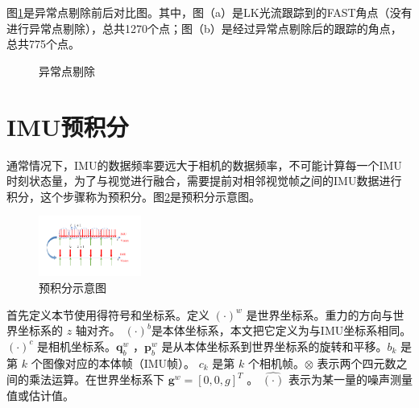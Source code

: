 图\ref{fig3_6}是异常点剔除前后对比图。其中，图（a）是LK光流跟踪到的FAST角点（没有进行异常点剔除），总共1270个点；图（b）是经过异常点剔除后的跟踪的角点，总共775个点。
\begin{figure}[h]\setlength{\belowcaptionskip}{-12pt}
\centering
	\caption{异常点剔除}\label{fig3_6}
\end{figure}
\section{IMU预积分}
通常情况下，IMU的数据频率要远大于相机的数据频率，不可能计算每一个IMU时刻状态量，为了与视觉进行融合，需要提前对相邻视觉帧之间的IMU数据进行积分，这个步骤称为预积分。图\ref{fig3_7}是预积分示意图。
\begin{figure}[h]\setlength{\belowcaptionskip}{-12pt}
	\centering
	\includegraphics[width=0.3\textwidth, angle=-90]{figures/chapter3/fig3_7}
	\caption{预积分示意图}\label{fig3_7}
\end{figure}

首先定义本节使用得符号和坐标系。定义 $\left(\cdot\right)^w $ 是世界坐标系。重力的方向与世界坐标系的 $z$ 轴对齐。 $\left(\cdot\right)^b $是本体坐标系，本文把它定义为与IMU坐标系相同。 $\left(\cdot\right)^c $ 是相机坐标系。$\mathbf{q}_b^w $ ，$\mathbf{p}_b^w $ 是从本体坐标系到世界坐标系的旋转和平移。$b_k $ 是第 $k$ 个图像对应的本体帧（IMU帧）。 $c_k$ 是第 $k$ 个相机帧。$\otimes  $ 表示两个四元数之间的乘法运算。在世界坐标系下 $\mathbf{g}^w=[0,0,g]^T $ 。 $\hat{\left(\cdot\right)} $ 表示为某一量的噪声测量值或估计值。
